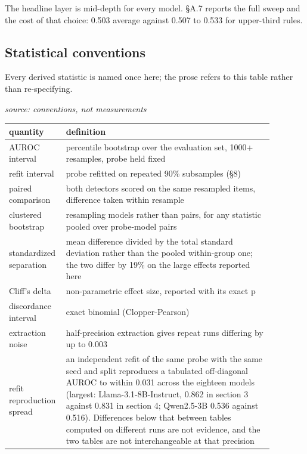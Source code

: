\documentclass[10pt]{article}
\begin{document}
The headline layer is mid-depth for every model. §A.7 reports the full sweep and the cost of that choice: 0.503 average against 0.507 to 0.533 for upper-third rules.

\subsection{Statistical conventions}

Every derived statistic is named once here; the prose refers to this table rather than re-specifying.

{\footnotesize\raggedright\sloppy \emph{source: conventions, not measurements}\par}

\begin{table}[H]
\centering
\small
\begin{tabular}{>{\raggedright\arraybackslash}p{0.134\linewidth} >{\raggedright\arraybackslash}p{0.746\linewidth}}
\toprule
\textbf{quantity} & \textbf{definition} \\
\midrule
AUROC interval & percentile bootstrap over the evaluation set, 1000+ resamples, probe held fixed \\
refit interval & probe refitted on repeated 90\% subsamples (§8) \\
paired comparison & both detectors scored on the same resampled items, difference taken within resample \\
clustered bootstrap & resampling models rather than pairs, for any statistic pooled over probe-model pairs \\
standardized separation & mean difference divided by the total standard deviation rather than the pooled within-group one; the two differ by 19\% on the large effects reported here \\
Cliff's delta & non-parametric effect size, reported with its exact p \\
discordance interval & exact binomial (Clopper-Pearson) \\
extraction noise & half-precision extraction gives repeat runs differing by up to 0.003 \\
refit reproduction spread & an independent refit of the same probe with the same seed and split reproduces a tabulated off-diagonal AUROC to within 0.031 across the eighteen models (largest: Llama-3.1-8B-Instruct, 0.862 in section 3 against 0.831 in section 4; Qwen2.5-3B 0.536 against 0.516). Differences below that between tables computed on different runs are not evidence, and the two tables are not interchangeable at that precision \\
\bottomrule
\end{tabular}
\end{table}
\end{document}
